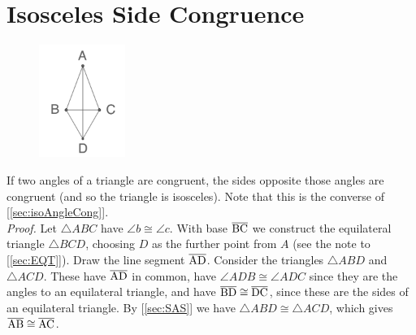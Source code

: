 \documentclass{report}
\begin{document}
\section{Isosceles Side Congruence}
\label{sec:isoSideCong}
\begin{figure} %
    \centering
    \includegraphics[width=0.25\textwidth]{ISOC2}
\end{figure}
If two angles of a triangle are congruent, the sides opposite those angles are congruent (and so the triangle is isosceles). Note that this is the converse of [\ref{sec:isoAngleCong}].
\\[\baselineskip]
\textit{Proof.} Let $\triangle{ABC}$ have $\angle b \cong \angle c$. With base $\overline{\rm BC}$ we construct the equilateral triangle $\triangle{BCD}$, choosing $D$ as the further point from $A$ (see the note to [\ref{sec:EQT}]). Draw the line segment $\overline{\rm AD}$.  Consider the triangles $\triangle{ABD}$ and $\triangle{ACD}$. These have $\overline{\rm AD}$ in common, have $\angle ADB \cong \angle ADC$ since they are the angles to an equilateral triangle, and have $\overline{\rm BD} \cong \overline{\rm DC}$, since these are the sides of an equilateral triangle. By [\ref{sec:SAS}] we have $\triangle{ABD} \cong \triangle{ACD}$, which gives $\overline{\rm AB} \cong \overline{\rm AC}$.
\end{document}
